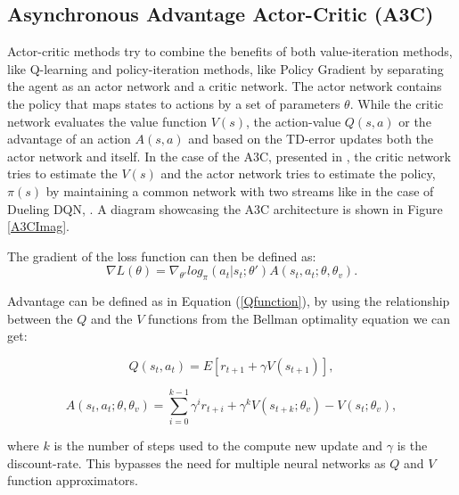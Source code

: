 \subsection{Asynchronous Advantage Actor-Critic (A3C)}\label{A3C}
\noindent Actor-critic methods try to combine the benefits of both value-iteration methods, like Q-learning and policy-iteration methods, like Policy Gradient by separating the agent as an actor network and a critic network. The actor network contains the policy that maps states to actions by a set of parameters $\theta$. While the critic network evaluates the value function $V(s)$, the action-value $Q(s,a)$ or the advantage of an action $A(s,a)$ and based on the \acrshort{TD}-error updates both the actor network and itself. In the case of the \acrshort{A3C}, presented in \cite{a3c}, the critic network tries to estimate the $V(s)$ and the actor network tries to estimate the policy, $\pi(s)$ by maintaining a common network with two streams like in the case of \acrshort{Dueling DQN}, \cite{duelingDQN}. A diagram showcasing the A3C architecture is shown in Figure \ref{A3CImag}.

The gradient of the loss function can then be defined as:
\begin{equation}
    \nabla L(\theta) = \nabla_{\theta'} log_\pi(a_t|s_t; \theta')A(s_t, a_t; \theta, \theta_v) .
\end{equation}

Advantage can be defined as in Equation (\ref{Qfunction}), by using the relationship between the $Q$ and the $V$ functions from the Bellman optimality equation we can get:

\begin{equation}
    Q(s_t, a_t) = E[r_{t+1} + \gamma V(s_{t+1})] ,
\end{equation}

\begin{equation}
    A(s_t, a_t; \theta, \theta_v) = \sum\limits_{i=0}^{k-1} \gamma^i r_{t+i} + \gamma^k V(s_{t+k}; \theta_v) - V(s_t;\theta_v),
\end{equation}

where $k$ is the number of steps used to the compute new update and $\gamma$ is the discount-rate. This bypasses the need for multiple neural networks as $Q$ and $V$ function approximators.

